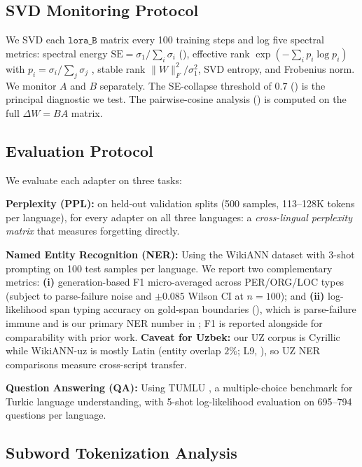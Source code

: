 \documentclass[11pt]{article}
\begin{document}
\subsection{SVD Monitoring Protocol}

We SVD each $\texttt{lora\_B}$ matrix every 100 training steps and log five spectral metrics: spectral energy $\text{SE} = \sigma_1 / \sum_i \sigma_i$ (), effective rank $\exp(-\sum_i p_i \log p_i)$ with $p_i = \sigma_i / \sum_j \sigma_j$ \citep{roy2007effective}, stable rank $\|W\|_F^2 / \sigma_1^2$, SVD entropy, and Frobenius norm. We monitor $A$ and $B$ separately. The SE-collapse threshold of $0.7$ () is the principal diagnostic we test. The pairwise-cosine analysis () is computed on the full $\Delta W = BA$ matrix.

\subsection{Evaluation Protocol}

We evaluate each adapter on three tasks:

\textbf{Perplexity (PPL):} on held-out validation splits (500 samples, 113--128K tokens per language), for every adapter on all three languages: a \emph{cross-lingual perplexity matrix} that measures forgetting directly.

\textbf{Named Entity Recognition (NER):} Using the WikiANN dataset \cite{pan2017cross} with 3-shot prompting on 100 test samples per language. We report two complementary metrics: \textbf{(i)} generation-based F1 micro-averaged across PER/ORG/LOC types (subject to parse-failure noise and $\pm 0.085$ Wilson CI at $n{=}100$); and \textbf{(ii)} log-likelihood span typing accuracy on gold-span boundaries (), which is parse-failure immune and is our primary NER number in ; F1 is reported alongside for comparability with prior work. \textbf{Caveat for Uzbek:} our UZ corpus is Cyrillic while WikiANN-uz is mostly Latin (entity overlap $2\%$; L9, ), so UZ NER comparisons measure cross-script transfer.

\textbf{Question Answering (QA):} Using TUMLU \cite{isbarov2024tumlu}, a multiple-choice benchmark for Turkic language understanding, with 5-shot log-likelihood evaluation on 695--794 questions per language.

\subsection{Subword Tokenization Analysis}
\label{sec:tokenization}
\end{document}
